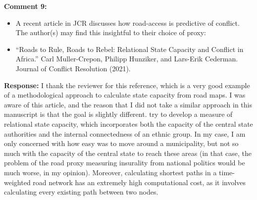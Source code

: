 \documentclass[12pt, a4paper, notitlepage]{article}
\begin{document}
\vspace{15pt}
\noindent\textbf{Comment 9:}
\begin{displayquote}
\begin{itemize}
\item A recent article in JCR discusses how road-access is predictive of conflict. The author(s) may find this insightful to their choice of proxy:
\item[] ``Roads to Rule, Roads to Rebel: Relational State Capacity and Conflict in Africa.'' Carl Muller-Crepon, Philipp Hunziker, and Lars-Erik Cederman. Journal of Conflict Resolution (2021).
\end{itemize}
\end{displayquote}

\noindent\textbf{Response:} I thank the reviewer for this reference, which is a very good example of a methodological approach to calculate state capacity from road maps. I was aware of this article, and the reason that I did not take a similar approach in this manuscript is that the goal is slightly different. \citet{Muller-Crepon:2021va} try to develop a measure of relational state capacity, which incorporates both the capacity of the central state authorities and the internal connectedness of an ethnic group. In my case, I am only concerned with how easy was to move around a municipality, but not so much with the capacity of the central state to reach these areas (in that case, the problem of the road proxy measuring insurality from national politics would be much worse, in my opinion). Moreover, calculating shortest paths in a time-weighted road network has an extremely high computational cost, as it involves calculating every existing path between two nodes.
\end{document}

